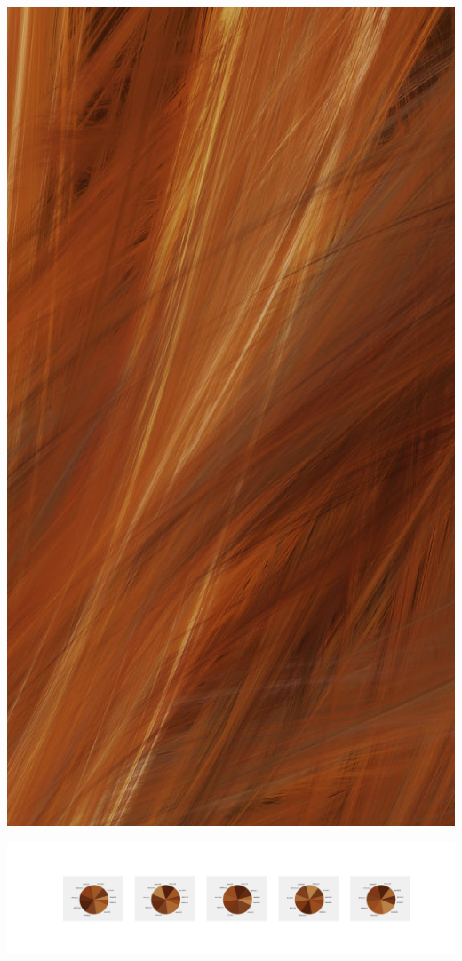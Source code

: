 \documentclass[11pt]{article}
\begin{document}
\begin{landscape}
    \begin{center}
    \includegraphics[width=\textwidth]{./nbimg/file (153).jpg}
    \end{center}

    \begin{center}
    \includegraphics[width=250mm]{./nbimg/pie-60.jpg}
    \end{center}


\end{landscape}
\end{document}
